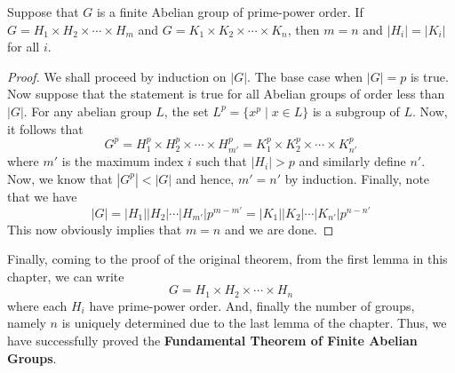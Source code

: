 \begin{lemma}
	Suppose that $G$ is a finite Abelian group of prime-power order. If $G=H_1\times H_2\times\cdots\times H_m$ and $G=K_1\times K_2\times\cdots\times K_n$, then $m=n$ and $|H_i|=|K_i|$ for all $i$.
\end{lemma}
\begin{proof}
	We shall proceed by induction on $|G|$. The base case when $|G|=p$ is true. Now suppose that the statement is true for all Abelian groups of order less than $|G|$. For any abelian group $L$, the set $L^p=\{x^p\mid x\in L\}$ is a subgroup of $L$. Now, it follows that 
	$$
	G^p=H_1^p\times H_2^p\times\cdots\times H_{m'}^p = K_1^p\times K_2^p\times\cdots\times K_{n'}^p
	$$
	where $m'$ is the maximum index $i$ such that $|H_i|>p$ and similarly define $n'$. Now, we know that $|G^p|<|G|$ and hence, $m'=n'$ by induction. Finally, note that we have 
	$$
	|G| = |H_1||H_2|\cdots|H_{m'}|p^{m-m'} = |K_1||K_2|\cdots|K_{n'}|p^{n-n'}
	$$
	This now obviously implies that $m=n$ and we are done.
\end{proof}

Finally, coming to the proof of the original theorem, from the first lemma in this chapter, we can write
$$
G = H_1\times H_2\times\cdots\times H_n
$$
where each $H_i$ have prime-power order. And, finally the number of groups, namely $n$ is uniquely determined due to the last lemma of the chapter. Thus, we have successfully proved the \textbf{Fundamental Theorem of Finite Abelian Groups}.
